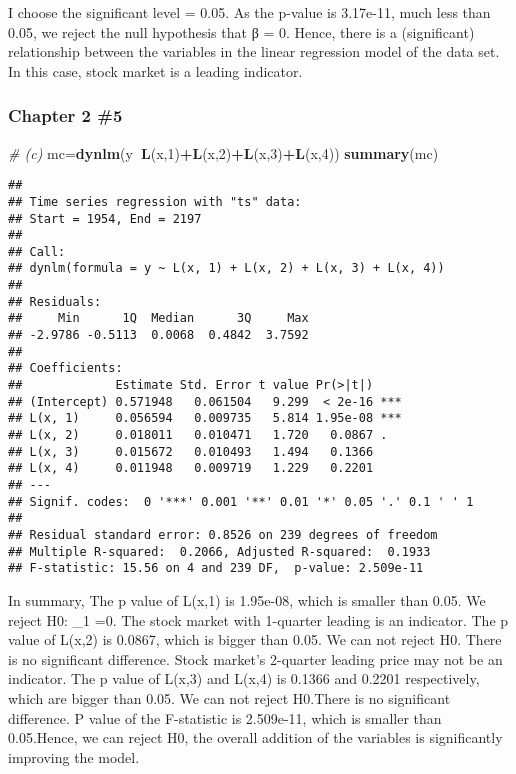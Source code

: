 \documentclass[]{article}
\newenvironment{Shaded}{\begin{snugshade}}{\end{snugshade}}
\newcommand{\KeywordTok}[1]{\textcolor[rgb]{0.13,0.29,0.53}{\textbf{#1}}}
\newcommand{\DecValTok}[1]{\textcolor[rgb]{0.00,0.00,0.81}{#1}}
\newcommand{\CommentTok}[1]{\textcolor[rgb]{0.56,0.35,0.01}{\textit{#1}}}
\newcommand{\OperatorTok}[1]{\textcolor[rgb]{0.81,0.36,0.00}{\textbf{#1}}}
\newcommand{\NormalTok}[1]{#1}
\begin{document}
\indent I choose the significant level = 0.05. As the p-value is
3.17e-11, much less than 0.05, we reject the null hypothesis that β = 0.
Hence, there is a (significant) relationship between the variables in
the linear regression model of the data set. In this case, stock market
is a leading indicator.

\subsubsection{Chapter 2 \#5}\label{chapter-2-5}

\begin{Shaded}
\begin{Highlighting}[]
\CommentTok{# (c) }
\NormalTok{mc=}\KeywordTok{dynlm}\NormalTok{(y}\OperatorTok{~}\KeywordTok{L}\NormalTok{(x,}\DecValTok{1}\NormalTok{)}\OperatorTok{+}\KeywordTok{L}\NormalTok{(x,}\DecValTok{2}\NormalTok{)}\OperatorTok{+}\KeywordTok{L}\NormalTok{(x,}\DecValTok{3}\NormalTok{)}\OperatorTok{+}\KeywordTok{L}\NormalTok{(x,}\DecValTok{4}\NormalTok{))}
\KeywordTok{summary}\NormalTok{(mc)}
\end{Highlighting}
\end{Shaded}

\begin{verbatim}
## 
## Time series regression with "ts" data:
## Start = 1954, End = 2197
## 
## Call:
## dynlm(formula = y ~ L(x, 1) + L(x, 2) + L(x, 3) + L(x, 4))
## 
## Residuals:
##     Min      1Q  Median      3Q     Max 
## -2.9786 -0.5113  0.0068  0.4842  3.7592 
## 
## Coefficients:
##             Estimate Std. Error t value Pr(>|t|)    
## (Intercept) 0.571948   0.061504   9.299  < 2e-16 ***
## L(x, 1)     0.056594   0.009735   5.814 1.95e-08 ***
## L(x, 2)     0.018011   0.010471   1.720   0.0867 .  
## L(x, 3)     0.015672   0.010493   1.494   0.1366    
## L(x, 4)     0.011948   0.009719   1.229   0.2201    
## ---
## Signif. codes:  0 '***' 0.001 '**' 0.01 '*' 0.05 '.' 0.1 ' ' 1
## 
## Residual standard error: 0.8526 on 239 degrees of freedom
## Multiple R-squared:  0.2066, Adjusted R-squared:  0.1933 
## F-statistic: 15.56 on 4 and 239 DF,  p-value: 2.509e-11
\end{verbatim}

\indent  In summary, The p value of L(x,1) is 1.95e-08, which is smaller
than 0.05. We reject H0: \beta\_1 =0. The stock market with 1-quarter
leading is an indicator. The p value of L(x,2) is 0.0867, which is
bigger than 0.05. We can not reject H0. There is no significant
difference. Stock market's 2-quarter leading price may not be an
indicator. The p value of L(x,3) and L(x,4) is 0.1366 and 0.2201
respectively, which are bigger than 0.05. We can not reject H0.There is
no significant difference. \indent P value of the F-statistic is
2.509e-11, which is smaller than 0.05.Hence, we can reject H0, the
overall addition of the variables is significantly improving the model.
\end{document}
